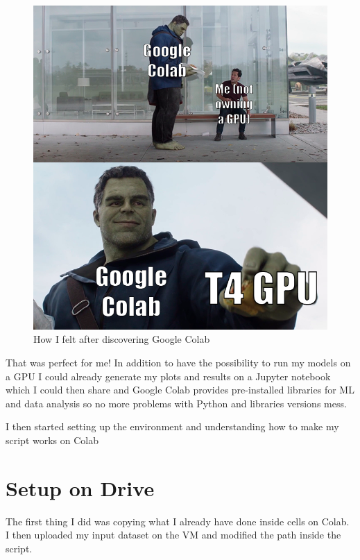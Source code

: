 \documentclass[
  letterpaper,
  DIV=11,
  numbers=noendperiod]{scrreprt}
\begin{document}
\begin{figure}

{\centering \includegraphics{hulk gpu.png}

}

\caption{How I felt after discovering Google Colab}

\end{figure}

That was perfect for me! In addition to have the possibility to run my
models on a GPU I could already generate my plots and results on a
Jupyter notebook which I could then share and Google Colab provides
pre-installed libraries for ML and data analysis so no more problems
with Python and libraries versions mess.

I then started setting up the environment and understanding how to make
my script works on Colab

\hypertarget{setup-on-drive}{%
\chapter{Setup on Drive}\label{setup-on-drive}}

The first thing I did was copying what I already have done inside cells
on Colab. I then uploaded my input dataset on the VM and modified the
path inside the script.
\end{document}
